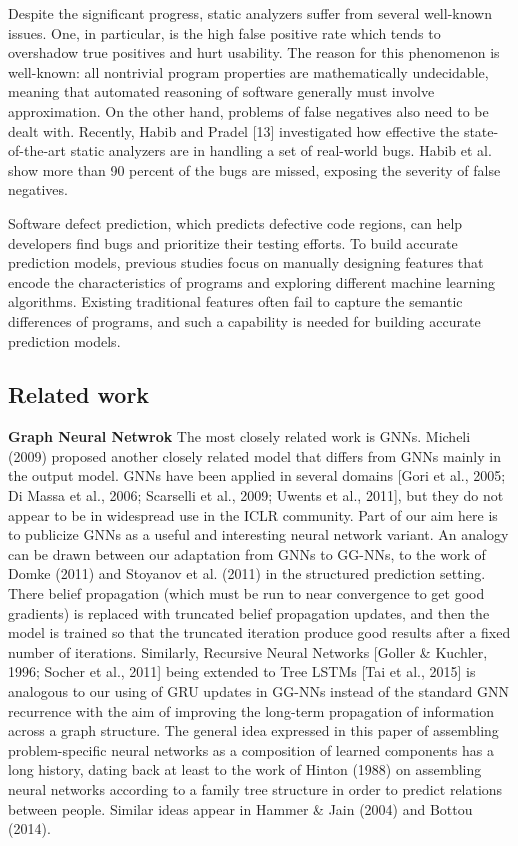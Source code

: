 \documentclass{article}
\begin{document}
Despite the significant progress, static analyzers suffer from several well-known issues. One, in particular, is the high false positive rate which tends to overshadow true positives and hurt usability. The reason for this phenomenon is well-known: all nontrivial program properties are mathematically undecidable, meaning that automated reasoning of software generally must involve approximation. On the other hand, problems of false negatives also need to be dealt with. Recently, Habib and Pradel [13] investigated how effective the state-of-the-art static analyzers are in handling a set of real-world bugs. Habib et al. show more than 90 percent of the bugs are missed, exposing the severity of false negatives.

Software defect prediction, which predicts defective code regions, can help developers find bugs and prioritize their testing efforts. To build accurate prediction models, previous studies focus on manually designing features that encode the characteristics of programs and exploring different machine learning algorithms. Existing traditional features often fail to capture the semantic differences of programs, and such a capability is needed for building accurate prediction models.
\subsection{Related work}

\textbf{Graph Neural Netwrok}
The most closely related work is GNNs. Micheli (2009) proposed another closely related model that differs from GNNs mainly in the output model. GNNs have been applied in several domains [Gori et al., 2005; Di Massa et al., 2006; Scarselli et al., 2009; Uwents et al., 2011], but they do not appear to be in widespread use in the ICLR community. Part of our aim here is to publicize GNNs as a useful and interesting neural network variant.
An analogy can be drawn between our adaptation from GNNs to GG-NNs, to the work of Domke (2011) and Stoyanov et al. (2011) in the structured prediction setting. There belief propagation (which must be run to near convergence to get good gradients) is replaced with truncated belief propagation updates, and then the model is trained so that the truncated iteration produce good results after a fixed number of iterations. Similarly, Recursive Neural Networks [Goller \& Kuchler, 1996; Socher et al., 2011] being extended to Tree LSTMs [Tai et al., 2015] is analogous to our using of GRU updates in GG-NNs instead of the standard GNN recurrence with the aim of improving the long-term propagation of information across a graph structure. The general idea expressed in this paper of assembling problem-specific neural networks as a composition of learned components has a long history, dating back at least to the work of Hinton (1988) on assembling neural networks according to a family tree structure in order to predict relations between people. Similar ideas appear in Hammer \& Jain (2004) and Bottou (2014).
\end{document}

